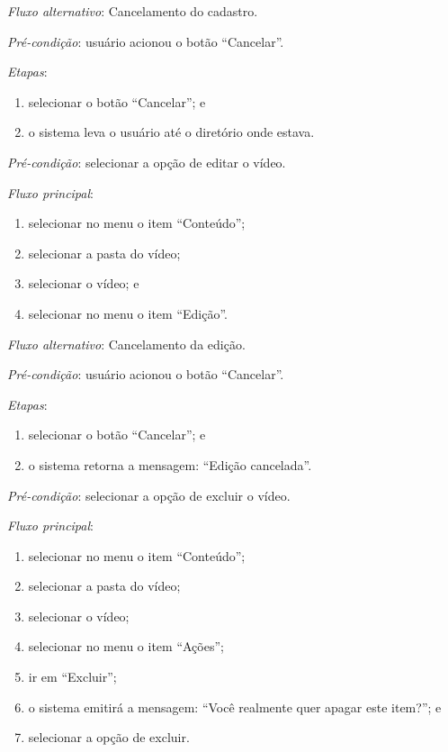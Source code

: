 \documentclass[a4paper,12pt]{article}
\begin{document}
\noindent \textit{Fluxo alternativo}: Cancelamento do cadastro.

\noindent \textit{Pré-condição}:  usuário acionou o botão ``Cancelar''.

\noindent \textit{Etapas}:

\begin{enumerate}
    \item selecionar o botão ``Cancelar''; e
    \item o sistema leva o usuário até o diretório onde estava.
\end{enumerate}



\vspace{0.7cm}

\noindent \textit{Pré-condição}: selecionar a opção de editar o vídeo.

\noindent \textit{Fluxo principal}:

\begin{enumerate}
    \item selecionar no menu o item ``Conteúdo'';
    \item selecionar a pasta do vídeo;
    \item selecionar o vídeo; e
    \item selecionar no menu o item ``Edição''.
\end{enumerate}

\noindent \textit{Fluxo alternativo}: Cancelamento da edição.

\noindent \textit{Pré-condição}: usuário acionou o botão ``Cancelar''.

\noindent \textit{Etapas}:

\begin{enumerate}
    \item selecionar o botão ``Cancelar''; e
    \item o sistema retorna a mensagem: ``Edição cancelada''.
\end{enumerate}


\vspace{0.7cm}

\noindent \textit{Pré-condição}: selecionar a opção de excluir o vídeo.

\noindent \textit{Fluxo principal}:

\begin{enumerate}
    \item selecionar no menu o item ``Conteúdo'';
    \item selecionar a pasta do vídeo;
    \item selecionar o vídeo;
    \item selecionar no menu o item ``Ações'';
    \item ir em ``Excluir'';
    \item o sistema emitirá a mensagem: ``Você realmente quer apagar este item?''; e
    \item selecionar a opção de excluir.
\end{enumerate}
\end{document}
